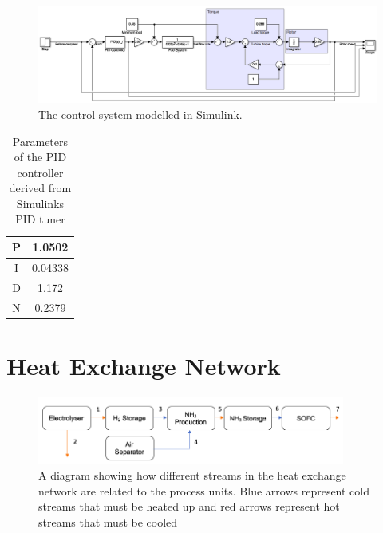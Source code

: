 \documentclass[11pt, oneside]{article}
\begin{document}
\begin{landscape}
\begin{figure} [h]
\centering
\includegraphics[width=1\textwidth]{./pictures/controlsimulink.png}
 \caption{The control system modelled in Simulink.} \label{fig:controlsimulink} 
 \end{figure}
 
  \begin {table} [h]
\begin{center}
\caption{Parameters of the PID controller derived from Simulinks PID tuner} \label{tab:PID} 
\begin{tabular}{ |c|c| }
 \hline
  P & 1.0502\\ 
 \hline
  I & 0.04338\\ 
  \hline
  D & 1.172\\ 
 \hline
 N & 0.2379\\
 \hline
\end{tabular}
\end{center}  
\end {table}
\end{landscape}

\newpage

\section{Heat Exchange Network}
\begin{figure} [h]
\centering
\includegraphics[width=0.9\textwidth]{./pictures/heatexflow.png}
  \caption{A diagram showing how different streams in the heat exchange network are related to the process units. Blue arrows represent cold streams that must be heated up and red arrows represent hot streams that must be cooled} \label{fig:heatexflow}
\end{figure}
\end{document}
